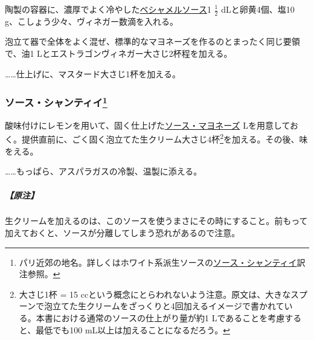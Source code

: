 \begin{recette}


陶製の容器に、濃厚でよく冷やした\protect\hyperlink{sauce-bechamel}{ベシャメルソース}1
\(\frac{1}{2}\) dLと卵黄4個、塩10
g、こしょう少々、ヴィネガー数滴を入れる。

泡立て器で全体をよく混ぜ、標準的なマヨネーズを作るのとまったく同じ要領で、油1
Lとエストラゴンヴィネガー大さじ2杯程を加える。

\ldots{}\ldots{}仕上げに、マスタード大さじ1杯を加える。

\atoaki{}

\hypertarget{sauce-chantilly-froide}{%
\subsubsection[ソース・シャンティイ]{\texorpdfstring{ソース・シャンティイ\footnote{パリ近郊の地名。詳しくはホワイト系派生ソースの\protect\hyperlink{sauce-chantilly}{ソース・シャンティイ}訳注参照。}}{ソース・シャンティイ}}\label{sauce-chantilly-froide}}



酸味付けにレモンを用いて、固く仕上げた\protect\hyperlink{mayonnaise}{ソース・マヨネーズ}\troisquarts{}
Lを用意しておく。提供直前に、ごく固く泡立てた生クリーム大さじ4杯\footnote{大さじ1杯
  = 15
  ccという概念にとらわれないよう注意。原文は、大きなスプーンで泡立てた生クリームをざっくりと4回加えるイメージで書かれている。本書における通常のソースの仕上がり量が約1
  Lであることを考慮すると、最低でも100 mL以上は加えることになるだろう。}を加える。その後、味をえる。

\ldots{}\ldots{}もっぱら、アスパラガスの冷製、温製に添える。

\hypertarget{nota-sauce-chantilly-froide}{%
\subparagraph{【原注】}\label{nota-sauce-chantilly-froide}}

生クリームを加えるのは、このソースを使うまさにその時にすること。前もって加えておくと、ソースが分離してしまう恐れがあるので注意。

\atoaki{}


\end{recette}
